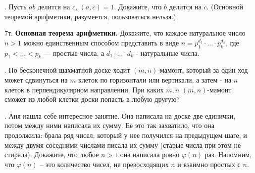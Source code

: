 . Пусть $ab$ делится на $c$, $(a,c)=1$. Докажите, что $b$ делится на $c$. (Основной теоремой арифметики, разумеется, пользоваться нельзя.)

\q7т. {\bf Основная теорема арифметики.} Докажите, что каждое натуральное число $n>1$ можно единственным способом представить в виде $n=p_{1}^{d_{1}}\cdot \dots \cdot p_{k}^{d_{k}}$, где $ p_{1}<\dots <p_{k}$ — простые числа, а $d_{1}\cdot \dots \cdot d_{k}$ - натуральные числа.

. По бесконечной шахматной доске ходит $(m,n)$-мамонт, который за один ход может сдвинуться на $m$ клеток по горизонтали или вертикали, а затем - на $n$ клеток в перпендикулярном направлении. При каких $m, n$ $(m,n)$-мамонт сможет из любой клетки доски попасть в любую другую?

. Аня нашла себе интересное занятие. Она написала на доске две единички, потом между ними написала их сумму. Ее это так захватило, что она продолжила: брала ряд чисел, который у нее получился на предыдущем шаге, и между двумя соседними числами писала их сумму (старые числа при этом не стирала). Докажите, что любое $n>1$ она написала ровно $\varphi(n)$ раз.  Напомним, что $\varphi(n)$ -- это количество чисел, не превосходящих $n$ и взаимно простых с $n$.
